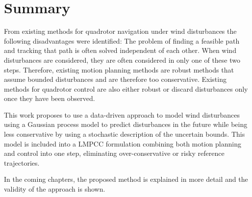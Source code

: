 \section{Summary}

From existing methods for quadrotor navigation under wind disturbances the following disadvantages were identified: The problem of finding a feasible path and tracking that path is often solved independent of each other. When wind disturbances are considered, they are often considered in only one of these two steps. Therefore, existing motion planning methods are robust methods that assume bounded disturbances and are therefore too conservative. Existing methods for quadrotor control are also either robust or discard disturbances only once they have been observed. 

This work proposes to use a data-driven approach to model wind disturbances using a Gaussian process model to predict disturbances in the future while being less conservative by using a stochastic description of the uncertain bounds. This model is included into a LMPCC formulation combining both motion planning and control into one step, eliminating over-conservative or risky reference trajectories. 

In the coming chapters, the proposed method is explained in more detail and the validity of the approach is shown. 